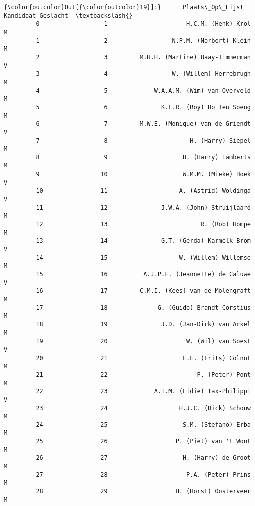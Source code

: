 \documentclass{article}
\begin{document}
            \begin{Verbatim}[commandchars=\\\{\}]
{\color{outcolor}Out[{\color{outcolor}19}]:}      Plaats\_Op\_Lijst                               Kandidaat Geslacht  \textbackslash{}
         0                  1                      H.C.M. (Henk) Krol        M   
         1                  2                  N.P.M. (Norbert) Klein        M   
         2                  3         M.H.H. (Martine) Baay-Timmerman        V   
         3                  4                  W. (Willem) Herrebrugh        M   
         4                  5             W.A.A.M. (Wim) van Overveld        M   
         5                  6               K.L.R. (Roy) Ho Ten Soeng        M   
         6                  7         M.W.E. (Monique) van de Griendt        V   
         7                  8                       H. (Harry) Siepel        M   
         8                  9                     H. (Harry) Lamberts        M   
         9                 10                     W.M.M. (Mieke) Hoek        V   
         10                11                    A. (Astrid) Woldinga        V   
         11                12               J.W.A. (John) Struijlaard        M   
         12                13                          R. (Rob) Hompe        M   
         13                14               G.T. (Gerda) Karmelk-Brom        V   
         14                15                    W. (Willem) Willemse        M   
         15                16          A.J.P.F. (Jeannette) de Caluwe        V   
         16                17         C.M.I. (Kees) van de Molengraft        M   
         17                18              G. (Guido) Brandt Corstius        M   
         18                19               J.D. (Jan-Dirk) van Arkel        M   
         19                20                      W. (Wil) van Soest        V   
         20                21                     F.E. (Frits) Colnot        M   
         21                22                         P. (Peter) Pont        M   
         22                23             A.I.M. (Lidie) Tax-Philippi        V   
         23                24                    H.J.C. (Dick) Schouw        M   
         24                25                     S.M. (Stefano) Erba        M   
         25                26                   P. (Piet) van 't Wout        M   
         26                27                     H. (Harry) de Groot        M   
         27                28                      P.A. (Peter) Prins        M   
         28                29                   H. (Horst) Oosterveer        M   

\end{Verbatim}
\end{document}
